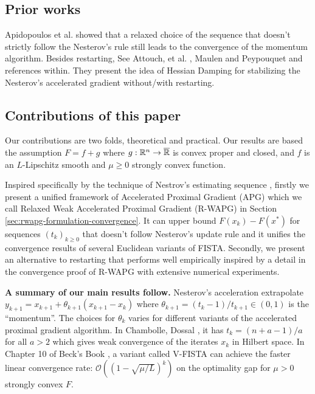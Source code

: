 \documentclass[12pt]{article}
\begin{document}
        \subsection{Prior works}
            Apidopoulos et al. \cite{apidopoulos_convergence_2018} showed that a relaxed choice of the sequence that doesn't strictly follow the Nesterov's rule still leads to the convergence of the momentum algorithm. 
            Besides restarting, See Attouch, et al. \cite{attouch_first-order_2022}, Maulen and Peypouquet \cite{maulen_speed_2023} and references within.
            They present the idea of Hessian Damping for stabilizing the Nesterov's accelerated gradient without/with restarting. 

    \subsection{Contributions of this paper}
        Our contributions are two folds, theoretical and practical. 
        Our results are based the assumption $F = f + g$ where $g:\mathbb R^n \rightarrow \overline{\mathbb R}$ is convex proper and closed, and $f$ is an $L$-Lipschitz smooth and $\mu \ge 0$ strongly convex function. 
        \par
        Inspired specifically by the technique of Nestrov's estimating sequence \cite{nesterov_lectures_2018}, firstly we present a unified framework of Accelerated Proximal Gradient (APG) which we call Relaxed Weak Accelerated Proximal Gradient (R-WAPG) in Section \ref{sec:rwapg-formulation-convergence}.
        It can upper bound $F(x_k) - F(x^*)$ for sequences $(t_k)_{k \ge 0}$ that doesn't follow Nesterov's update rule and it unifies the convergence results of several Euclidean variants of FISTA. 
        Secondly, we present an alternative to restarting that performs well empirically inspired by a detail in the convergence proof of R-WAPG with extensive numerical experiments. 
        \par
        \textbf{A summary of our main results follow. } 
        Nesterov's acceleration extrapolate $y_{k + 1} = x_{k + 1} + \theta_{k + 1}(x_{k + 1} - x_k)$ where $\theta_{k + 1} = (t_{k} - 1)/t_{k + 1} \in (0, 1)$ is the ``momentum''. 
        The choices for $\theta_k$ varies for different variants of the accelerated proximal gradient algorithm. 
        In Chambolle, Dossal \cite{chambolle_convergence_2015}, it has $t_k = (n + a - 1)/a$ for all $a > 2$ which gives weak convergence of the iterates $x_k$ in Hilbert space. 
        In Chapter 10 of Beck's Book \cite{beck_first-order_2017}, a variant called V-FISTA can achieve the faster linear convergence rate: $\mathcal O((1 - \sqrt{\mu/L})^k)$ on the optimality gap for $\mu > 0$ strongly convex $F$. 
\end{document}
